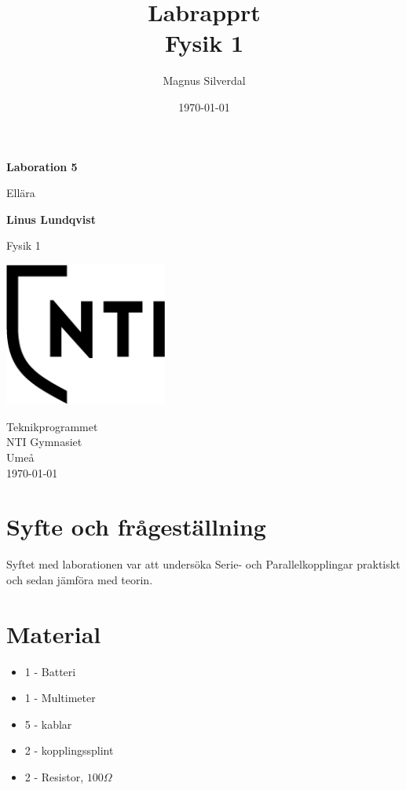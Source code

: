\documentclass[11p]{article}
\title{Labrapprt \\ \small Fysik 1}
\author{Magnus Silverdal }
\date{\today}
\begin{document}
    \begin{titlepage}
        \begin{center}
            \vspace*{1cm}

            \Huge
            \textbf{Laboration 5}

            \vspace{0.5cm}
            \LARGE
            Ellära

            \vspace{1.5cm}

            \textbf{Linus Lundqvist}

            \vfill


            Fysik 1

            \vspace{0.8cm}

            \includegraphics[width=0.4\textwidth]{NTI Gymnasiet_Symbol_print_svart.png}

            \Large
            Teknikprogrammet\\
            NTI Gymnasiet\\
            Umeå\\
            \today

        \end{center}
    \end{titlepage}
    \section{Syfte och frågeställning}

    Syftet med laborationen var att undersöka Serie- och Parallelkopplingar praktiskt och sedan jämföra med teorin.

    \section{Material}

    \begin{itemize}
        \item 1 - Batteri
        \item 1 - Multimeter
        \item 5 - kablar
        \item 2 - kopplingssplint
        \item 2 - Resistor, $100\Omega$
    \end{itemize}
\end{document}
